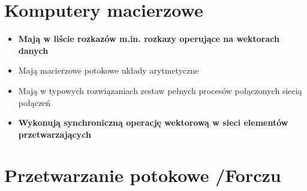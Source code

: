 \documentclass[a4paper,twoside]{article}
\begin{document}
\section{Komputery macierzowe}
	\begin{itemize}
    \item \textbf{Mają w liście rozkazów m.in. rozkazy operujące na wektorach danych}
    \item Mają macierzowe potokowe układy arytmetyczne
    \item Mają w typowych rozwiązaniach zestaw pełnych procesów połączonych siecią połączeń
    \item \textbf{Wykonują synchroniczną operację wektorową w sieci elementów przetwarzających}
    \end{itemize}
    
\section{Przetwarzanie potokowe {\small /Forczu}}
\end{document}
